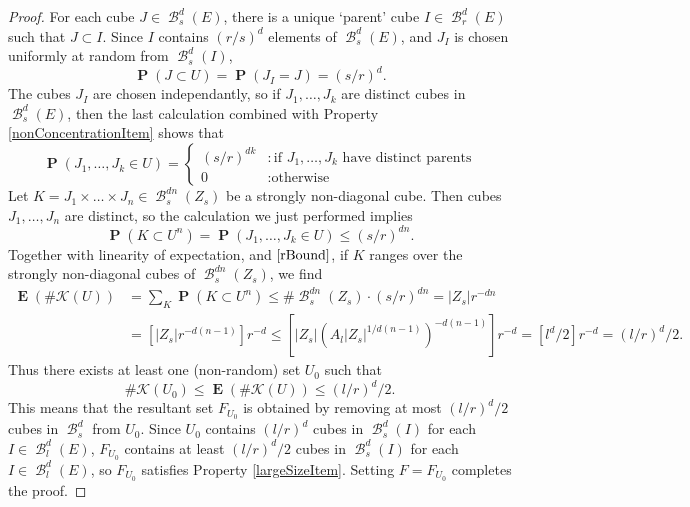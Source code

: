 \documentclass[dvipsnames,letterpaper,12pt]{article}
\numberwithin{equation}{section}
\theoremstyle{plain}
\theoremstyle{remark}
\DeclareMathOperator{\Prob}{\mathbf{P}}
\DeclareMathOperator{\Expect}{\mathbf{E}}
\DeclareMathOperator{\B}{\mathcal{B}}
\begin{document}
\begin{proof}
	For each cube $J \in \B_s^d(E)$, there is a unique `parent' cube $I \in \B_r^d(E)$ such that $J \subset I$. Since $I$ contains $(r/s)^d$ elements of $\B^d_s(E)$, and $J_I$ is chosen uniformly at random from $\B^d_s(I)$,
	\[ \Prob(J \subset U) = \Prob(J_I = J) = (s/r)^d. \]
	The cubes $J_I$ are chosen independantly, so if $J_1, \dots, J_k$ are distinct cubes in $\B^d_s(E)$, then the last calculation combined with Property \ref{nonConcentrationItem} shows that
\[ 		\Prob(J_1, \dots, J_k \in U) = \begin{cases} (s/r)^{dk} &: \text{if $J_1, \dots, J_k$ have distinct parents} \\ 0 &: \text{otherwise} \end{cases} \]
	Let $K = J_1 \times \dots \times J_n \in \B^{dn}_s(Z_s)$ be a strongly non-diagonal cube. Then cubes $J_1, \dots, J_n$ are distinct, so the calculation we just performed implies
	\[	\Prob(K \subset U^n) = \Prob(J_1, \dots, J_k \in U) \leq (s/r)^{dn}. \]
	Together with linearity of expectation, and $\eqref{rBound}$, if $K$ ranges over the strongly non-diagonal cubes of $\B^{dn}_s(Z_s)$, we find
	\begin{align*}
		\Expect(\# \mathcal{K}(U)) &= \sum_K \Prob(K \subset U^n) \leq \# \B_s^{dn}(Z_s) \cdot (s/r)^{dn} = |Z_s| r^{-dn}\\
		&= \left[ |Z_s| r^{-d(n-1)} \right] r^{-d} \leq \left[ |Z_s| (A_l |Z_s|^{1/d(n-1)})^{-d(n-1)} \right] r^{-d} = \left[ l^d/2 \right] r^{-d} = (l/r)^d /2.
	\end{align*}
	Thus there exists at least one (non-random) set $U_0$ such that
	\begin{equation}\label{KU0Small}
		\# \mathcal{K}(U_0) \leq \Expect(\# \mathcal{K}(U)) \leq (l/r)^d/2.
	\end{equation}
	This means that the resultant set $F_{U_0}$ is obtained by removing at most $(l/r)^d/2$ cubes in $\B^d_s$ from $U_0$. Since $U_0$ contains $(l/r)^d$ cubes in $\B^d_s(I)$ for each $I \in \B^d_l(E)$, $F_{U_0}$ contains at least $(l/r)^d/2$ cubes in $\B^d_s(I)$ for each $I \in \B^d_l(E)$, so $F_{U_0}$ satisfies Property \ref{largeSizeItem}. Setting $F = F_{U_0}$ completes the proof.
\end{proof}
\end{document}
